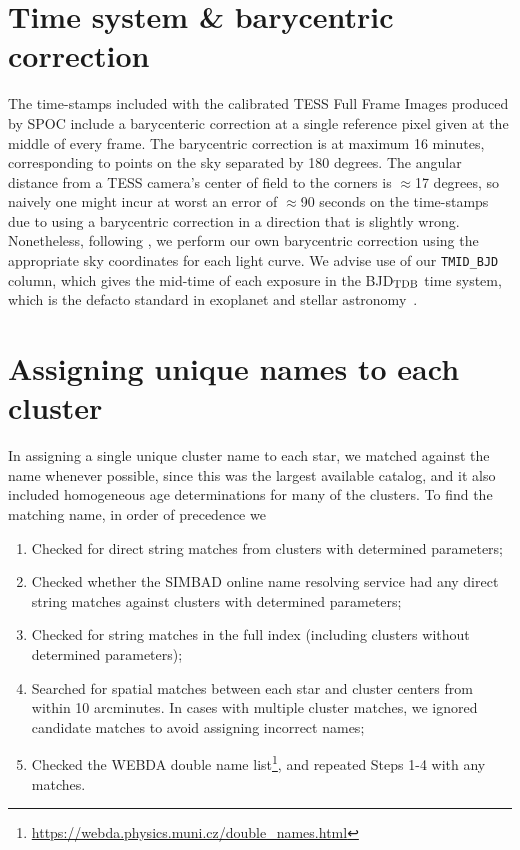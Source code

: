\documentclass[12pt,twocolumn,tighten]{aastex62}
\begin{document}
\clearpage
\newpage

                            
 

\appendix
\section{Time system \& barycentric correction}
\label{appendix:time}

The time-stamps included with the calibrated TESS Full Frame Images
produced by SPOC include a barycenteric correction at
a single reference pixel given at the middle of every frame.
The barycentric correction is at maximum 16 minutes, corresponding to
points on the sky separated by 180 degrees.
The angular distance from a TESS camera's center of field to the corners
is $\approx$17 degrees, so naively one might incur at worst an error of
$\approx$90 seconds on the time-stamps due to using a barycentric
correction in a direction that is slightly wrong.
Nonetheless, following
\citet{bouma_wasp-4b_2019},
we perform our own barycentric correction using the appropriate
sky coordinates for each light curve.
We advise use of our \texttt{TMID\_BJD} column, which gives the
mid-time of each exposure in the BJD$_{\rm TDB}$ time system, which
is the defacto standard in exoplanet and stellar
astronomy~\citep{eastman_achieving_2010}.

\section{Assigning unique names to each cluster}
\label{appendix:uniquenames}

In assigning a single unique cluster name to each star, we matched
against the \citet{Kharchenko_et_al_2013} name whenever possible,
since this was the largest available catalog, and it also included
homogeneous age determinations for many of the clusters.
To find the matching name, in order of precedence we
\begin{enumerate}
  \item Checked for direct string matches from
    \citet{Kharchenko_et_al_2013} clusters with determined parameters;
  \item Checked whether the SIMBAD online name resolving service \citep{wenger_simbad_2000} had
    any direct string matches against \citet{Kharchenko_et_al_2013}
    clusters with determined parameters;
  \item Checked for string matches in the full
    \citet{Kharchenko_et_al_2013} index (including clusters without
    determined parameters);
  \item Searched for spatial matches between each star and cluster
    centers from \citet{Kharchenko_et_al_2013} within 10 arcminutes.
    In cases with multiple cluster matches, we ignored candidate
    matches to avoid assigning incorrect names;
  \item Checked the WEBDA double name
    list\footnote{\url{https://webda.physics.muni.cz/double_names.html}},
    and repeated Steps 1-4 with any matches.
\end{enumerate}
\end{document}
